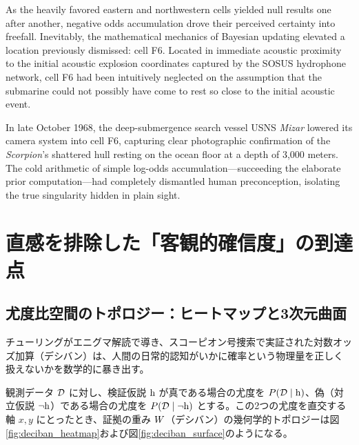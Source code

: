     As the heavily favored eastern and northwestern cells yielded null results one after another, negative odds accumulation drove their perceived certainty into freefall. Inevitably, the mathematical mechanics of Bayesian updating elevated a location previously dismissed: cell F6. Located in immediate acoustic proximity to the initial acoustic explosion coordinates captured by the SOSUS hydrophone network, cell F6 had been intuitively neglected on the assumption that the submarine could not possibly have come to rest so close to the initial acoustic event.

    In late October 1968, the deep-submergence search vessel USNS \textit{Mizar} lowered its camera system into cell F6, capturing clear photographic confirmation of the \textit{Scorpion}'s shattered hull resting on the ocean floor at a depth of 3,000 meters. The cold arithmetic of simple log-odds accumulation—succeeding the elaborate prior computation—had completely dismantled human preconception, isolating the true singularity hidden in plain sight.

\fi

\ifja
    \section{直感を排除した「客観的確信度」の到達点}
    \label{sec:objective_conviction}

    \subsection{尤度比空間のトポロジー：ヒートマップと3次元曲面}

    チューリングがエニグマ解読で導き、スコーピオン号捜索で実証された対数オッズ加算（デシバン）は、人間の日常的認知がいかに確率という物理量を正しく扱えないかを数学的に暴き出す。

    観測データ $\mathcal{D}$ に対し、検証仮説 $\mathrm{h}$ が真である場合の尤度を $P(\mathcal{D} \mid \mathrm{h})$、偽（対立仮説 $\neg \mathrm{h}$）である場合の尤度を $P(\mathcal{D} \mid \neg \mathrm{h})$ とする。この2つの尤度を直交する軸 $x, y$ にとったとき、証拠の重み $W$（デシバン）の幾何学的トポロジーは図\ref{fig:deciban_heatmap}および図\ref{fig:deciban_surface}のようになる。

    
    

